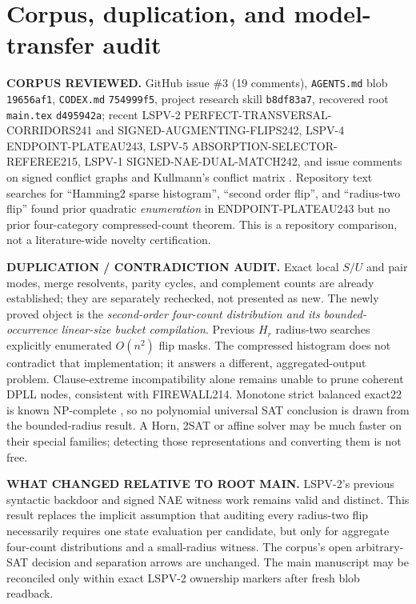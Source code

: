 \documentclass[10pt]{article}
\begin{document}
\section{Corpus, duplication, and model-transfer audit}
\noindent\textbf{CORPUS REVIEWED.} GitHub issue \#3 (19 comments), \texttt{AGENTS.md} blob \texttt{19656af1}, \texttt{CODEX.md} \texttt{754999f5}, project research skill \texttt{b8df83a7}, recovered root \texttt{main.tex} \texttt{d495942a}; recent LSPV-2 PERFECT-TRANSVERSAL-CORRIDORS241 and SIGNED-AUGMENTING-FLIPS242, LSPV-4 ENDPOINT-PLATEAU243, LSPV-5 ABSORPTION-SELECTOR-REFEREE215, LSPV-1 SIGNED-NAE-DUAL-MATCH242, and issue comments on signed conflict graphs and Kullmann's conflict matrix \cite{Kullmann2003}. Repository text searches for ``Hamming2 sparse histogram'', ``second order flip'', and ``radius-two flip'' found prior quadratic \emph{enumeration} in ENDPOINT-PLATEAU243 but no prior four-category compressed-count theorem. This is a repository comparison, not a literature-wide novelty certification.

\noindent\textbf{DUPLICATION / CONTRADICTION AUDIT.} Exact local $S/U$ and pair modes, merge resolvents, parity cycles, and complement counts are already established; they are separately rechecked, not presented as new. The newly proved object is the \emph{second-order four-count distribution and its bounded-occurrence linear-size bucket compilation}. Previous $H_r$ radius-two searches explicitly enumerated $O(n^2)$ flip masks. The compressed histogram does not contradict that implementation; it answers a different, aggregated-output problem. Clause-extreme incompatibility alone remains unable to prune coherent DPLL nodes, consistent with FIREWALL214. Monotone strict balanced exact22 is known NP-complete \cite{DarmannDocker2021}, so no polynomial universal SAT conclusion is drawn from the bounded-radius result. A Horn, 2SAT or affine solver may be much faster on their special families; detecting those representations and converting them is not free.

\noindent\textbf{WHAT CHANGED RELATIVE TO ROOT MAIN.} LSPV-2's previous syntactic backdoor and signed NAE witness work remains valid and distinct. This result replaces the implicit assumption that auditing every radius-two flip necessarily requires one state evaluation per candidate, but only for aggregate four-count distributions and a small-radius witness. The corpus's open arbitrary-SAT decision and separation arrows are unchanged. The main manuscript may be reconciled only within exact LSPV-2 ownership markers after fresh blob readback.
\end{document}
